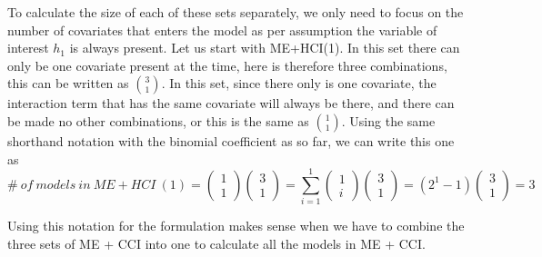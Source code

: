 To calculate the size of each of these sets separately, we only need to focus on the number of covariates that enters the model as per assumption the variable of interest $h_1$ is always present. Let us start with ME+HCI(1). In this set there can only be one covariate present at the time, here is therefore three combinations, this can be written as $\binom{3}{1}$. In this set, since there only is one covariate, the interaction term that has the same covariate will always be there, and there can be made no other combinations, or this is the same as $\binom{1}{1}$. Using the same shorthand notation with the binomial coefficient as so far, we can write this one as
\[\#\ of\ models\ in\ ME+HCI\ \left(1\right)=\left( \begin{array}{c}
1 \\ 
1 \end{array}
\right)\left( \begin{array}{c}
3 \\ 
1 \end{array}
\right)=\sum^1_{i=1}{\left( \begin{array}{c}
1 \\ 
i \end{array}
\right)}\left( \begin{array}{c}
3 \\ 
1 \end{array}
\right)=\left(2^1-1\right)\left( \begin{array}{c}
3 \\ 
1 \end{array}
\right)=3\] 

Using this notation for the formulation makes sense when we have to combine the three sets of ME + CCI into one to calculate all the models in ME + CCI.

